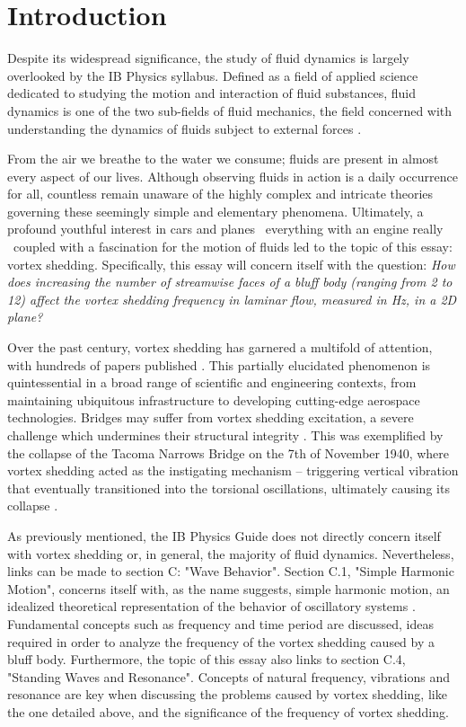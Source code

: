 \section{Introduction}

Despite its widespread significance, the study of fluid dynamics is largely overlooked by the IB Physics syllabus. Defined as a field of applied science dedicated to studying the motion and interaction of fluid substances, fluid dynamics is one of the two sub-fields of fluid mechanics, the field concerned with understanding the dynamics of fluids subject to external forces \parencite{livescience_fluid_dynamics}. 

From the air we breathe to the water we consume; fluids are present in almost every aspect of our lives. Although observing fluids in action is a daily occurrence for all, countless remain unaware of the highly complex and intricate theories governing these seemingly simple and elementary phenomena. Ultimately, a profound youthful interest in cars and planes \textemdash\ everything with an engine really \textemdash\ coupled with a fascination for the motion of fluids led to the topic of this essay: vortex shedding. Specifically, this essay will concern itself with the question: \textit{How does increasing the number of streamwise faces of a bluff body (ranging from 2 to 12) affect the vortex shedding frequency in laminar flow, measured in Hz, in a 2D plane?}

Over the past century, vortex shedding has garnered a multifold of attention, with hundreds of papers published \parencite[61]{buresti1998}. This partially elucidated phenomenon is quintessential in a broad range of scientific and engineering contexts, from maintaining ubiquitous infrastructure to developing cutting-edge aerospace technologies. Bridges may suffer from vortex shedding excitation, a severe challenge which undermines their structural integrity \parencite[1040]{jurado2012}. This was exemplified by the collapse of the Tacoma Narrows Bridge on the 7th of November 1940, where vortex shedding acted as the instigating mechanism -- triggering vertical vibration that eventually transitioned into the torsional oscillations, ultimately causing its collapse \parencite{tacoma_bridge_vibrations}.

As previously mentioned, the IB Physics Guide \parencite{ib_physics_2025} does not directly concern itself with vortex shedding or, in general, the majority of fluid dynamics. Nevertheless, links can be made to section C: "Wave Behavior". Section C.1, "Simple Harmonic Motion", concerns itself with, as the name suggests, simple harmonic motion, an idealized theoretical representation of the behavior of oscillatory systems \parencite[313]{allum2023}. Fundamental concepts such as frequency and time period are discussed, ideas required in order to analyze the frequency of the vortex shedding caused by a bluff body. Furthermore, the topic of this essay also links to section C.4, "Standing Waves and Resonance". Concepts of natural frequency, vibrations and resonance are key when discussing the problems caused by vortex shedding, like the one detailed above, and the significance of the frequency of vortex shedding. 





